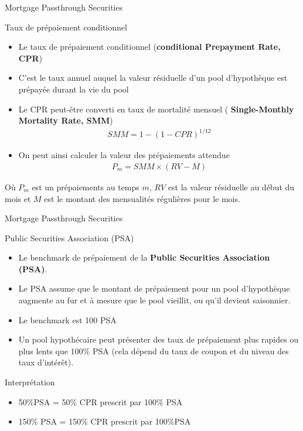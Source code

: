 \documentclass[10pt,a4paper]{beamer}
\begin{document}
\begin{frame}{Mortgage Passthrough Securities}
\begin{block}{Taux de prépaiement conditionnel}
\begin{itemize}[label=\bullet]
\item Le taux de prépaiement conditionnel (\textbf{conditional Prepayment Rate, CPR})
\item C’est le taux annuel auquel la valeur résiduelle d’un pool d’hypothèque est prépayée durant la vie du pool
\item Le CPR peut-être converti en taux de mortalité mensuel ( \textbf{Single-Monthly Mortality Rate, SMM})
\begin{align*}
SMM=1-(1-CPR)^{1/12}
\end{align*}
\item On peut ainsi calculer la valeur des prépaiements attendue
\begin{align*}
P_m=SMM \times (RV-M)
\end{align*}
\end{itemize}
Où $P_m$ est un prépaiements au temps $m$,  $RV$ est la valeur résiduelle au début du mois et $M$ est le montant des mensualités régulières pour le mois.
\end{block}
\end{frame}


\begin{frame}{Mortgage Passthrough Securities}
\begin{block}{Public Securities Association (PSA)}
\begin{itemize}[label=\bullet]
\item Le benchmark de prépaiement de la \textbf{Public Securities Association (PSA)}.
\item Le PSA assume que le montant de prépaiement pour un pool d’hypothèque augmente au fur et à mesure que le pool vieillit, ou qu’il devient saisonnier.
\item Le benchmark est 100 PSA
\item Un pool hypothécaire peut présenter des taux de prépaiement plus rapides ou plus lents que 100\% PSA (cela dépend du taux de coupon et du niveau des taux d’intérêt).
\end{itemize}
\end{block}
\begin{block}{Interprétation}
\begin{itemize}[label=\bullet]
\item 50\%PSA = 50\% CPR prescrit par 100\% PSA
\item 150\% PSA = 150\% CPR prescrit par 100\%PSA
\end{itemize}
\end{block}
\end{frame}
\end{document}

